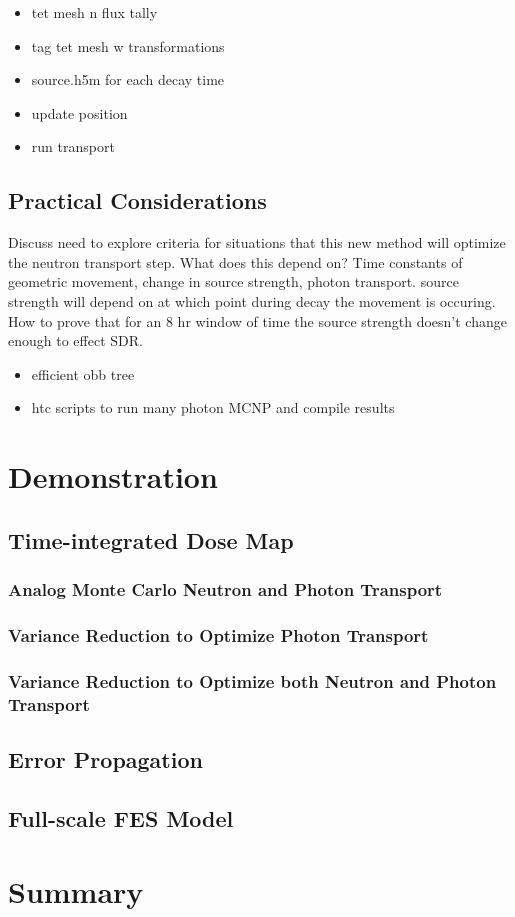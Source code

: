 \begin{itemize}
\item tet mesh n flux tally
\item tag tet mesh w transformations
\item source.h5m for each decay time
\item update position
\item run transport
\end{itemize}

\subsection{Practical Considerations}
Discuss need to explore criteria for situations that this new method will
optimize the neutron transport step.  What does this depend on?  Time constants
of geometric movement, change in source strength, photon transport.  source
strength will depend on at which point during decay the movement is occuring.
How to prove that for an 8 hr window of time the source strength doesn't change
enough to effect SDR.
\begin{itemize}
        \item efficient obb tree
	\item htc scripts to run many photon MCNP and compile results

\end{itemize}


\section{Demonstration} \label{sec:demo}


\subsection{Time-integrated Dose Map}

\subsubsection{Analog Monte Carlo Neutron and Photon Transport}\label{sec:analog_n_p}

\subsubsection{Variance Reduction to Optimize Photon Transport}\label{sec:vr_p}

\subsubsection{Variance Reduction to Optimize both Neutron and Photon Transport}\label{sec:vr_n_p}

\subsection{Error Propagation}\label{sec:error}

\subsection{Full-scale FES Model} \label{sec:full_scale}

\section{Summary}\label{sec:summary}

